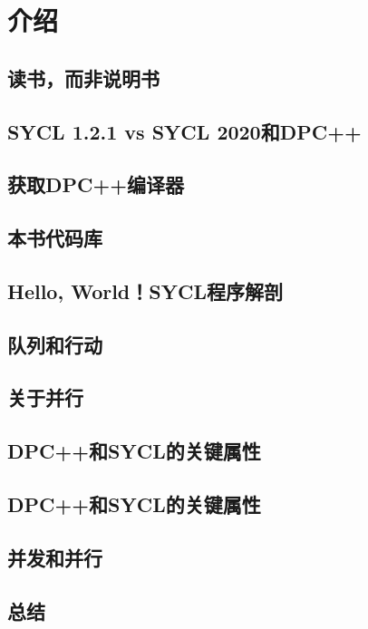 \documentclass[11pt,a4paper,UTF8]{ctexart}
\begin{document}
	\section{介绍}
		\subsection{读书，而非说明书}
		\subsection{SYCL 1.2.1 vs SYCL 2020和DPC++}
		\subsection{获取DPC++编译器}
		\subsection{本书代码库}
		\subsection{Hello, World！SYCL程序解剖}
		\subsection{队列和行动}
		\subsection{关于并行}
		\subsection{DPC++和SYCL的关键属性}
		\subsection{DPC++和SYCL的关键属性}
		\subsection{并发和并行}
		\subsection{总结}
\end{document}
